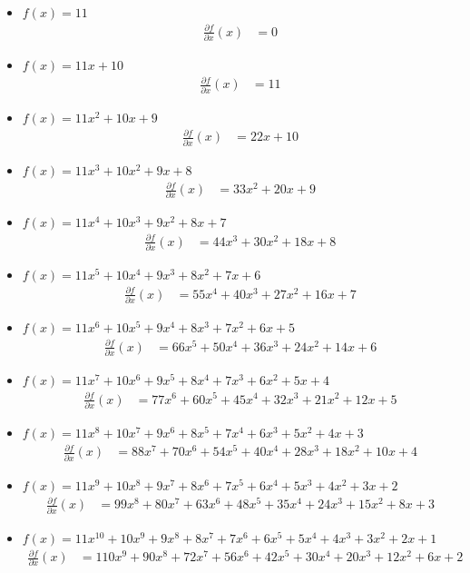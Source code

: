 \documentclass[12pt, a4paper]{article}
\begin{document}
\begin{itemize}
	\item $f(x) = 11$
	\begin{align*}
		\frac{\partial f}{\partial x}(x) &= 0
	\end{align*}
	\item $f(x) = 11x + 10$
	\begin{align*}
		\frac{\partial f}{\partial x}(x) &= 11
	\end{align*}
	\item $f(x) = 11x^2 + 10x + 9$
	\begin{align*}
		\frac{\partial f}{\partial x}(x) &= 22 x + 10
	\end{align*}
	\item $f(x) = 11x^3 + 10x^2 + 9x + 8$
	\begin{align*}
		\frac{\partial f}{\partial x}(x) &= 33 x^2 + 20 x + 9
	\end{align*}
	\item $f(x) = 11x^4 + 10x^3 + 9x^2 + 8x + 7$
	\begin{align*}
		\frac{\partial f}{\partial x}(x) &= 44 x^3 + 30 x^2 + 18 x + 8
	\end{align*}
	\item $f(x) = 11x^5 + 10x^4 + 9x^3 + 8x^2 + 7x + 6$
	\begin{align*}
		\frac{\partial f}{\partial x}(x) &= 55 x^4 + 40 x^3 + 27 x^2 + 16 x + 7
	\end{align*}
	\item $f(x) = 11x^6 + 10x^5 + 9x^4 + 8x^3 + 7x^2 + 6x + 5$
	\begin{align*}
		\frac{\partial f}{\partial x}(x) &= 66 x^5 + 50 x^4 + 36 x^3 + 24 x^2 + 14 x + 6
	\end{align*}
	\item $f(x) = 11x^7 + 10x^6 + 9x^5 + 8x^4 + 7x^3 + 6x^2 + 5x + 4$
	\begin{align*}
		\frac{\partial f}{\partial x}(x) &= 77 x^6 + 60 x^5 + 45 x^4 + 32 x^3 + 21 x^2 + 12 x + 5
	\end{align*}
	\item $f(x) = 11x^8 + 10x^7 + 9x^6 + 8x^5 + 7x^4 + 6x^3 + 5x^2 + 4x + 3$
	\begin{align*}
		\frac{\partial f}{\partial x}(x) &= 88 x^7 + 70 x^6 + 54 x^5 + 40 x^4 + 28 x^3 + 18 x^2 + 10 x + 4
	\end{align*}
	\item $f(x) = 11x^9 + 10x^8 + 9x^7 + 8x^6 + 7x^5 + 6x^4 + 5x^3 + 4x^2 + 3x + 2$
	\begin{align*}
		\frac{\partial f}{\partial x}(x) &= 99 x^8 + 80 x^7 + 63 x^6 + 48 x^5 + 35 x^4 + 24 x^3 + 15 x^2 + 8 x + 3
	\end{align*}
	\item $f(x) = 11x^{10} + 10x^9 + 9x^8 + 8x^7 + 7x^6 + 6x^5 + 5x^4 + 4x^3 + 3x^2 + 2x + 1$
	\begin{align*}
		\frac{\partial f}{\partial x}(x) &= 110 x^9 + 90 x^8 + 72 x^7 + 56 x^6 + 42 x^5 + 30 x^4 + 20 x^3 + 12 x^2 + 6 x + 2
	\end{align*}
\end{itemize}




\end{document}

